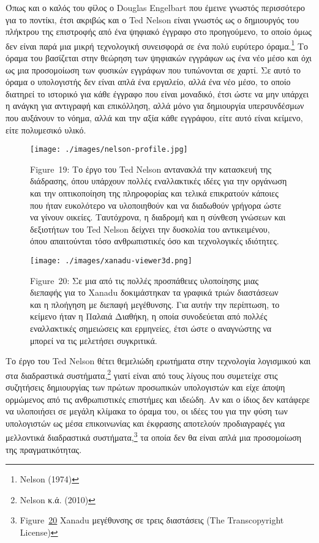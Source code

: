 \documentclass[
]{article}
\begin{document}
Όπως και ο καλός του φίλος ο Douglas Engelbart που έμεινε γνωστός
περισσότερο για το ποντίκι, έτσι ακριβώς και ο Ted Nelson είναι γνωστός
ως ο δημιουργός του πλήκτρου της επιστροφής από ένα ψηφιακό έγγραφο στο
προηγούμενο, το οποίο όμως δεν είναι παρά μια μικρή τεχνολογική
συνεισφορά σε ένα πολύ ευρύτερο όραμα.\footnote{Nelson (1974)} Το όραμα
του βασίζεται στην θεώρηση των ψηφιακών εγγράφων ως ένα νέο μέσο και όχι
ως μια προσομοίωση των φυσικών εγγράφων που τυπώνονται σε χαρτί. Σε αυτό
το όραμα ο υπολογιστής δεν είναι απλά ένα εργαλείο, αλλά ένα νέο μέσο,
το οποίο διατηρεί το ιστορικό για κάθε έγγραφο που είναι μοναδικό, έτσι
ώστε να μην υπάρχει η ανάγκη για αντιγραφή και επικόλληση, αλλά μόνο για
δημιουργία υπερσυνδέσμων που αυξάνουν το νόημα, αλλά και την αξία κάθε
εγγράφου, είτε αυτό είναι κείμενο, είτε πολυμεσικό υλικό.

\leavevmode{}%
\begin{figure}
\hypertarget{fig:nelson-profile}{%
\centering
\texttt{[image: ./images/nelson-profile.jpg]}
\caption{Figure~19: Το έργο του Ted Nelson αντανακλά την κατασκευή της
διάδρασης, όπου υπάρχουν πολλές εναλλακτικές ιδέες για την οργάνωση και
την οπτικοποίηση της πληροφορίας και τελικά επικρατούν κάποιες που ήταν
ευκολότερο να υλοποιηθούν και να διαδωθούν γρήγορα ώστε να γίνουν
οικείες. Ταυτόχρονα, η διαδρομή και η σύνθεση γνώσεων και δεξιοτήτων του
Ted Nelson δείχνει την δυσκολία του αντικειμένου, όπου απαιτούνται τόσο
ανθρωπιστικές όσο και τεχνολογικές ιδιότητες.}\label{fig:nelson-profile}
}
\end{figure}

\leavevmode{}%
\begin{figure}
\hypertarget{fig:xanadu-viewer3d}{%
\centering
\texttt{[image: ./images/xanadu-viewer3d.png]}
\caption{Figure~20: Σε μια από τις πολλές προσπάθειες υλοποίησης μιας
διεπαφής για το Xanadu δοκιμάστηκαν τα γραφικά τριών διαστάσεων και η
πλοήγηση με διεπαφή μεγέθυνσης. Για αυτήν την περίπτωση, το κείμενο ήταν
η Παλαιά Διαθήκη, η οποία συνοδεύεται από πολλές εναλλακτικές σημειώσεις
και ερμηνείες, έτσι ώστε ο αναγνώστης να μπορεί να τις μελετήσει
συγκριτικά.}\label{fig:xanadu-viewer3d}
}
\end{figure}

Το έργο του Ted Nelson θέτει θεμελιώδη ερωτήματα στην τεχνολογία
λογισμικού και στα διαδραστικά συστήματα,\footnote{Nelson κ.ά. (2010)}
γιατί είναι από τους λίγους που συμετείχε στις συζητήσεις δημιουργίας
των πρώτων προσωπικών υπολογιστών και είχε άποψη ορμώμενος από τις
ανθρωπιστικές επιστήμες και ιδεώδη. Αν και ο ίδιος δεν κατάφερε να
υλοποιήσει σε μεγάλη κλίμακα το όραμα του, οι ιδέες του για την φύση των
υπολογιστών ως μέσα επικοινωνίας και έκφρασης αποτελούν προδιαγραφές για
μελλοντικά διαδραστικά συστήματα,\footnote{Figure~\protect\hyperlink{fig:xanadu-viewer3d}{20}
  Xanadu μεγέθυνσης σε τρεις διαστάσεις (The Transcopyright License)} τα
οποία δεν θα είναι απλά μια προσομοίωση της πραγματικότητας.
\end{document}
